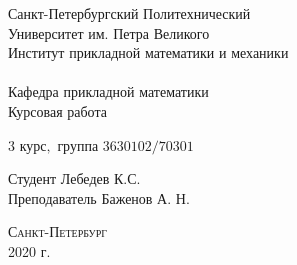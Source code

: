 \documentclass[a4]{article}
\begin{document}



\def\contentsname{\LARGE{Содержание}}
\thispagestyle{empty}
\begin{center} 
\vspace{2cm} 
{\Large \sc Санкт-Петербургский Политехнический}\\
\vspace{2mm}
{\Large \sc Университет} им. {\Large\sc Петра Великого}\\
\vspace{1cm}
{\large \sc Институт прикладной математики и механики\\ 
\vspace{0.5mm}
\textsc{}}\\ 
\vspace{0.5mm}
{\large\sc Кафедра прикладной математики}\\
\vspace{15mm}
{\huge \sc Курсовая работа \\
\vspace{6mm}
 }
\vspace*{2mm}
\vspace{1cm}

{\sc $3$ курс$,$ группа $3630102/70301$}

\vspace{2cm} 
Студент \hfill Лебедев К.С.\\
\vspace{1cm}
Преподаватель \hfill Баженов А. Н.\\
\vspace{20mm} 

\end{center} 
\begin{center}
\vfill {\large\textsc{Санкт-Петербург}}\\ 
2020 г.
\end{center}

\end{document}

